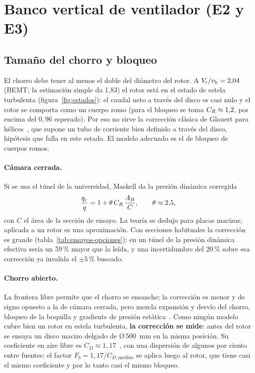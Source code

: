 \section{Banco vertical de ventilador (E2 y E3)}\label{sec:ensayos-banco}

\subsection{Tamaño del chorro y bloqueo}
El chorro debe tener al menos el doble del diámetro del rotor. A $V_{\mathrm{r}}/v_{\mathrm{h}}=2{,}04$ (BEMT; la estimación simple da 1,83) el rotor
está en el estado de estela turbulenta (figura~\ref{fig:estados}): el caudal neto a
través del disco es casi nulo y el rotor se comporta como un cuerpo romo (para el bloqueo
se toma $C_{R}\approx1{,}2$, por encima del $0{,}96$ esperado). Por eso no sirve la corrección clásica de Glauert para hélices~\cite{ensayos-barlow1999},
que supone un tubo de corriente bien definido a través del disco, hipótesis que falla en
este estado. El modelo adecuado es el de bloqueo de cuerpos
romos.

\paragraph{Cámara cerrada.} Si se usa el túnel de la universidad, Maskell da la presión
dinámica corregida~\cite{ensayos-maskell1963}
\begin{equation}
  \frac{q_c}{q} = 1 + \theta\,C_{R}\,\frac{A_R}{C}, \qquad \theta\approx2{,}5,
  \label{eq:ensayos-maskell}
\end{equation}
con $C$ el área de la sección de ensayo. La teoría se dedujo para placas macizas; aplicada
a un rotor es una aproximación. Con secciones habituales la corrección es grande
(tabla~\ref{tab:ensayos-opciones}): en un túnel de  la presión
dinámica efectiva sería un 59\,\% mayor que la leída, y una incertidumbre del 20\,\% sobre esa
corrección ya invalida el $\pm5$\,\% buscado.

\paragraph{Chorro abierto.} La frontera libre permite que el chorro se ensanche; la
corrección es menor y de signo opuesto a la de cámara cerrada, pero mezcla expansión y
desvío del chorro, bloqueo de la boquilla y gradiente de presión
estática~\cite{ensayos-mercker1996}. Como ningún modelo cubre bien un rotor en estela
turbulenta, \textbf{la corrección se mide}: antes del rotor se ensaya un disco macizo
delgado de Ø\,\SI{500}{mm} en la misma posición. Su coeficiente en aire libre es
$C_D\approx1{,}17$~\cite{hoerner1965}, con una dispersión de algunos por ciento entre
fuentes; el factor $F_b=1{,}17/C_{D,\text{medido}}$ se aplica
luego al rotor, que tiene casi el mismo coeficiente y por lo tanto casi el mismo bloqueo.

